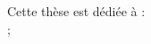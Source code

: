 
\begin{dedicace}
Cette thèse est dédiée à :\\

	 ;\\

\end{dedicace}

\begin{epigraphe}
\end{epigraphe}


